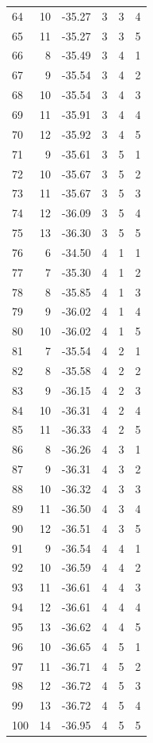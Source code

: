 \begin{longtable}{lrrrrr}
64 & 10 & -35.27 & 3 & 3 & 4 \\
65 & 11 & -35.27 & 3 & 3 & 5 \\
66 & 8 & -35.49 & 3 & 4 & 1 \\
67 & 9 & -35.54 & 3 & 4 & 2 \\
68 & 10 & -35.54 & 3 & 4 & 3 \\
69 & 11 & -35.91 & 3 & 4 & 4 \\
70 & 12 & -35.92 & 3 & 4 & 5 \\
71 & 9 & -35.61 & 3 & 5 & 1 \\
72 & 10 & -35.67 & 3 & 5 & 2 \\
73 & 11 & -35.67 & 3 & 5 & 3 \\
74 & 12 & -36.09 & 3 & 5 & 4 \\
75 & 13 & -36.30 & 3 & 5 & 5 \\
76 & 6 & -34.50 & 4 & 1 & 1 \\
77 & 7 & -35.30 & 4 & 1 & 2 \\
78 & 8 & -35.85 & 4 & 1 & 3 \\
79 & 9 & -36.02 & 4 & 1 & 4 \\
80 & 10 & -36.02 & 4 & 1 & 5 \\
81 & 7 & -35.54 & 4 & 2 & 1 \\
82 & 8 & -35.58 & 4 & 2 & 2 \\
83 & 9 & -36.15 & 4 & 2 & 3 \\
84 & 10 & -36.31 & 4 & 2 & 4 \\
85 & 11 & -36.33 & 4 & 2 & 5 \\
86 & 8 & -36.26 & 4 & 3 & 1 \\
87 & 9 & -36.31 & 4 & 3 & 2 \\
88 & 10 & -36.32 & 4 & 3 & 3 \\
89 & 11 & -36.50 & 4 & 3 & 4 \\
90 & 12 & -36.51 & 4 & 3 & 5 \\
91 & 9 & -36.54 & 4 & 4 & 1 \\
92 & 10 & -36.59 & 4 & 4 & 2 \\
93 & 11 & -36.61 & 4 & 4 & 3 \\
94 & 12 & -36.61 & 4 & 4 & 4 \\
95 & 13 & -36.62 & 4 & 4 & 5 \\
96 & 10 & -36.65 & 4 & 5 & 1 \\
97 & 11 & -36.71 & 4 & 5 & 2 \\
98 & 12 & -36.72 & 4 & 5 & 3 \\
99 & 13 & -36.72 & 4 & 5 & 4 \\
100 & 14 & -36.95 & 4 & 5 & 5 \\

\end{longtable}
